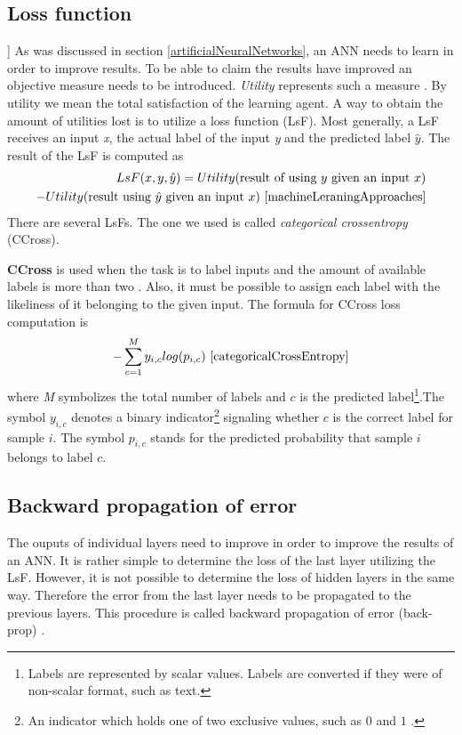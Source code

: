 \subsection{Loss function}\label{lossFunction}]
As was discussed in section \ref{artificialNeuralNetworks}, an ANN needs to learn in order to improve results. To be able to claim the results have improved an objective measure needs to be introduced. \textit{Utility} represents such a measure \cite{machineLeraningApproaches}. By utility we mean the total satisfaction of the learning agent. A way to obtain the amount of utilities lost is to utilize a loss function (LsF). Most generally, a LsF receives an input \textit{x}, the actual label of the input \textit{y} and the predicted label $\hat{y}$. The result of the LsF is computed as
\[
\begin{aligned}
LsF(x, y, \hat{y}) = Utility(\text{result of using }y \text{ given an input }x) \\
- Utility(\text{result using }\hat{y} \text{ given an input }x)~\cite{machineLeraningApproaches}
\end{aligned}
\]
There are several LsFs. The one we used is called \textit{categorical crossentropy} (CCross). 

\textbf{CCross} is used when the task is to label inputs and the amount of available labels is more than two \cite{categoricalCrossEntropy}. Also, it must be possible to assign each label with the likeliness of it belonging to the given input. The formula for CCross loss computation is
\[
-\sum\limits_{c=1}^M y_{i,c} log(p_{i, c})~\cite{categoricalCrossEntropy}
\]
where \textit{M} symbolizes the total number of labels and $c$ is the predicted label\footnote{Labels are represented by scalar values. Labels are converted if they were of non-scalar format, such as text.}.The symbol $y_{i, c}$ denotes a binary indicator\footnote{An indicator which holds one of two exclusive values, such as $0$ and $1$ .} signaling whether $c$ is the correct label for sample $i$. The symbol $p_{i, c}$ stands for the predicted probability that sample $i$ belongs to label $c$. 


\subsection{Backward propagation of error}\label{backpropagation}
The ouputs of individual layers need to improve in order to improve the results of an ANN. It is rather simple to determine the loss of the last layer utilizing the LsF. However, it is not possible to determine the loss of hidden layers in the same way. Therefore the error from the last layer needs to be propagated to the previous layers. This procedure is called backward propagation of error (back-prop) \cite{machineLeraningApproaches}. 

